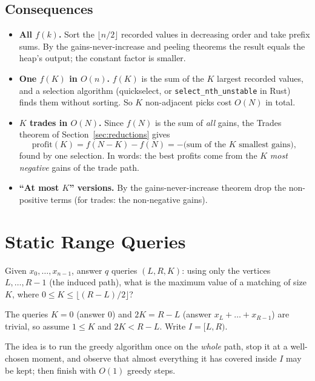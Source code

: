 \documentclass[11pt]{article}
\begin{document}
\subsection{Consequences}
\begin{itemize}[leftmargin=1.5em,itemsep=2pt]
  \item \textbf{All $f(k)$.} Sort the $\lfloor n/2\rfloor$ recorded values in
        decreasing order and take prefix sums. By the gains-never-increase and peeling theorems the result equals the heap's output; the
        constant factor is smaller.
  \item \textbf{One $f(K)$ in $O(n)$.} $f(K)$ is the sum of the $K$ largest
        recorded values, and a selection algorithm (quickselect, or
        \texttt{select\_nth\_unstable} in Rust) finds them without sorting.
        So $K$ non-adjacent picks cost $O(N)$ in total.
  \item \textbf{$K$ trades in $O(N)$.} Since $f(N)$ is the sum of \emph{all}
        gains, the Trades theorem of Section~\ref{sec:reductions} gives
        \[ \text{profit}(K)=f(N-K)-f(N)=-\bigl(\text{sum of the }K\text{ smallest gains}\bigr), \]
        found by one selection. In words: the best profits come from the
        $K$ \emph{most negative} gains of the trade path.
  \item \textbf{``At most $K$'' versions.} By the gains-never-increase theorem drop
        the non-positive terms (for trades: the non-negative gains).
\end{itemize}

\section{Static Range Queries}\label{sec:range}
\begin{definitionbox}
Given $x_0,\dots,x_{n-1}$, answer $q$ queries $(L,R,K)$: using only the
vertices $L,\dots,R-1$ (the induced path), what is the maximum value of a
matching of size $K$, where $0\le K\le\lfloor(R-L)/2\rfloor$?
\end{definitionbox}
The queries $K=0$ (answer $0$) and $2K=R-L$ (answer $x_L+\dots+x_{R-1}$)
are trivial, so assume $1\le K$ and $2K<R-L$. Write $I=[L,R)$.

The idea is to run the greedy algorithm once on the \emph{whole} path, stop it
at a well-chosen moment, and observe that almost everything it has
covered inside $I$ may be kept; then finish with $O(1)$ greedy steps.
\end{document}
